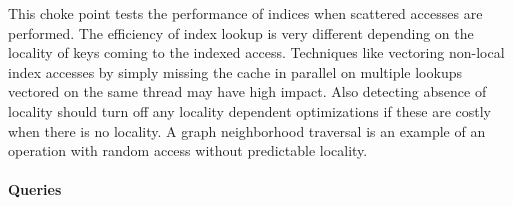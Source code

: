 
This choke point tests the performance of indices when scattered accesses are
performed. The efficiency of index lookup is very different depending on the
locality of keys coming to the indexed access. Techniques like vectoring
non-local index accesses by simply missing the cache in parallel on multiple
lookups vectored on the same thread may have high impact. Also detecting absence
of locality should turn off any locality dependent optimizations if these are
costly when there is no locality. A graph neighborhood traversal is an example
of an operation with random access without predictable locality.


\paragraph{Queries}
{\raggedright
}